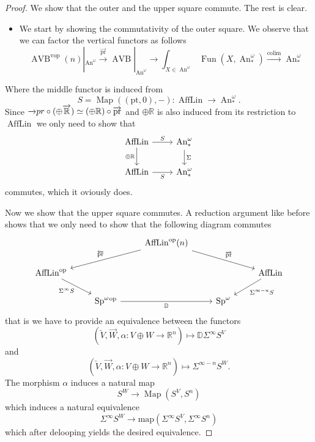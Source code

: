 \documentclass{article}
\newcommand{\xto}{\xrightarrow}
\newcommand{\R}{\mathbb{R}} %
\newcommand{\pt}{\mathrm{pt}}
\newcommand{\op}{\mathrm{op}}
\newcommand{\vop}{\mathrm{vop}}
\newcommand{\pr}{\mathrm{pr}}
\DeclareMathOperator{\AVB}{AVB}
\DeclareMathOperator{\An}{An}
\DeclareMathOperator{\Sp}{Sp}
\DeclareMathOperator{\Fun}{Fun}
\DeclareMathOperator{\AffLin}{AffLin}
\DeclareMathOperator{\Map}{Map}
\DeclareMathOperator*{\colim}{colim}
\begin{document}
\begin{proof}
    We show that the outer and the upper square commute. The rest is clear.
    \begin{itemize} 
        \item 
        We start by showing the commutativity of the outer square.
        We observe that we can factor the vertical functors as follows 
        \[
            \AVB^\vop(n)|_{\An^\omega} \xto{\overrightarrow{\pr}} \AVB|_{\An^\omega} \to \int_{X \in \An^\omega} \Fun(X,\An_*^\omega) \xto{\colim} \An_*^\omega 
        \]
    \end{itemize} 
    Where the middle functor is induced from 
    \[
        S = \Map((\pt,0), -) \colon \AffLin \to \An_*^\omega.  
    \]  
    Since $\overrightarrow \pr \circ (\oplus \overrightarrow{\R}) \simeq  (\oplus \R )\circ \overrightarrow{\pr}$ 
    and $\oplus \R$ is also induced from its restriction to $\AffLin$ we only need to show that 
    \[\begin{tikzcd}
        \AffLin & {\An^\omega_*} \\
        \AffLin & {\An^\omega_*}
        \arrow["{\oplus \R}"', from=1-1, to=2-1]
        \arrow["\Sigma", from=1-2, to=2-2]
        \arrow["S", from=1-1, to=1-2]
        \arrow["S"', from=2-1, to=2-2]
    \end{tikzcd}\]
    commutes, which it oviously does.
    \item Now we show that the upper square commutes. 
    A reduction argument like before shows that we only need to show that the following diagram commutes
    \[\begin{tikzcd}
        && {\AffLin^\op(n)} \\
        {\AffLin^\op} &&&& \AffLin \\
        & {{\Sp^\omega}{^\op}} && {\Sp^\omega}
        \arrow["{\overleftarrow{\pr}}"', from=1-3, to=2-1]
        \arrow["{\overrightarrow{\pr}}", from=1-3, to=2-5]
        \arrow["{\Sigma^{\infty - n} S}", from=2-5, to=3-4]
        \arrow["{\mathbb D}"', from=3-2, to=3-4]
        \arrow["{\Sigma^\infty S}"', from=2-1, to=3-2]
    \end{tikzcd}\]
    that is we have to provide an equivalence between the functors 
    \[
    (\overleftarrow V, \overrightarrow{W}, \alpha \colon V \oplus W \to \R^n) \mapsto \mathbb D \Sigma^\infty S^V    
    \]
    and 
    \[
    (\overleftarrow V, \overrightarrow{W}, \alpha \colon V \oplus W \to \R^n) \mapsto \Sigma^{\infty - n} S^W.
    \]
    The morphism $\alpha$ induces a natural map 
    \[
    S^W \to \Map(S^V, S^n)    
    \]
    which induces a natural equivalence 
    \[
    \Sigma^\infty S^W \to \mathrm{map}(\Sigma^\infty S^V, \Sigma^\infty S^n)    
    \]
    which after delooping yields the desired equivalence.
\end{proof}
\end{document}
